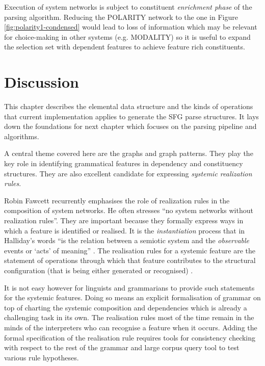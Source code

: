 Execution of system networks is subject to constituent \textit{enrichment phase} of the parsing algorithm. Reducing the POLARITY network to the one in Figure \ref{fig:polarity1-condensed} would lead to loss of information which may be relevant for choice-making in other systems (e.g. MODALITY) so it is useful to expand the selection set with dependent features to achieve feature rich constituents.

\section{Discussion}
This chapter describes the elemental data structure and the kinds of operations that current implementation applies to generate the SFG parse structures. It lays down the foundations for next chapter which focuses on the parsing pipeline and algorithms. 

A central theme covered here are the graphs and graph patterns. They play the key role in identifying grammatical features in dependency and constituency structures. They are also excellent candidate for expressing \textit{systemic realization rules}. 

Robin Fawcett recurrently emphasises the role of realization rules in the composition of system networks. He often stresses ``no system networks without realization rules''. They are important because they formally express ways in which a feature is identified or realised. It is the \textit{instantiation} process that in Halliday's words ``is the relation between a semiotic system and the \textit{observable} events or `acts' of meaning'' \citep[emphasis added]{Halliday2003-systemic-theory}. The realisation rules for a systemic feature are the statement of operations through which that feature contributes to the structural configuration (that is being either generated or recognised) \citep[p.86]{Fawcett2000}.

It is not easy however for linguists and grammarians to provide such statements for the systemic features. Doing so means an explicit formalisation of grammar on top of charting the systemic composition and dependencies which is already a challenging task in its own. The realisation rules most of the time remain in the minds of the interpreters who can recognise a feature when it occurs. Adding the formal specification of the realisation rule requires tools for consistency checking with respect to the rest of the grammar and large corpus query tool to test various rule hypotheses. 

